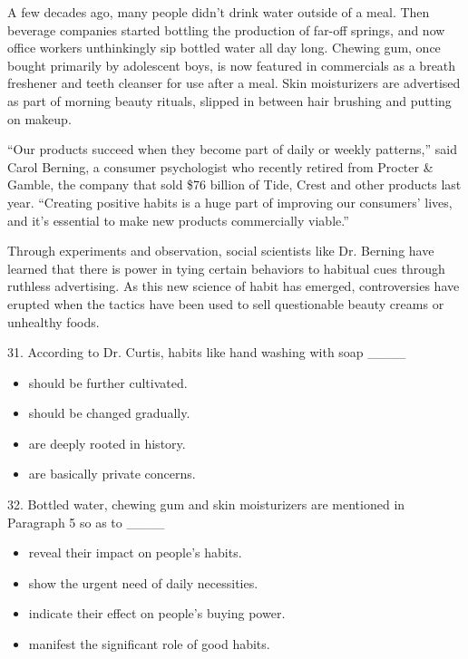 \documentclass[UTF8,11pt]{ctexart}
\begin{document}
A few decades ago, many people didn’t drink water outside of a meal. Then beverage companies started bottling the production of far-off springs, and now office workers unthinkingly sip bottled water all day long. Chewing gum, once bought primarily by adolescent boys, is now featured in commercials as a breath freshener and teeth cleanser for use after a meal. Skin moisturizers are advertised as part of morning beauty rituals, slipped in between hair brushing and putting on makeup.


“Our products succeed when they become part of daily or weekly patterns,” said Carol Berning, a consumer psychologist who recently retired from Procter \& Gamble, the company that sold \$76 billion of Tide, Crest and other products last year. “Creating positive habits is a huge part of improving our consumers’ lives, and it’s essential to make new products commercially viable.”


Through experiments and observation, social scientists like Dr. Berning have learned that there is power in tying certain behaviors to habitual cues through ruthless advertising. As this new science of habit has emerged, controversies have erupted when the tactics have been used to sell questionable beauty creams or unhealthy foods.


31. According to Dr. Curtis, habits like hand washing with soap \_\_\_\_


\begin{itemize}[leftmargin=2em,itemsep=.2em,topsep=.4em]\item[A.] should be further cultivated.
\item[B.] should be changed gradually.
\item[C.] are deeply rooted in history.
\item[D.] are basically private concerns.
\end{itemize}

32. Bottled water, chewing gum and skin moisturizers are mentioned in Paragraph 5 so as to \_\_\_\_


\begin{itemize}[leftmargin=2em,itemsep=.2em,topsep=.4em]\item[A.] reveal their impact on people’s habits.
\item[B.] show the urgent need of daily necessities.
\item[C.] indicate their effect on people’s buying power.
\item[D.] manifest the significant role of good habits.
\end{itemize}
\end{document}
